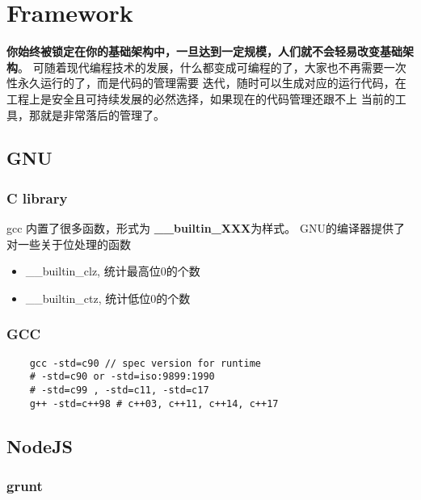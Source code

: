 \clearpage
\part{Framework}

\textbf{你始终被锁定在你的基础架构中，一旦达到一定规模，人们就不会轻易改变基础架构}。
可随着现代编程技术的发展，什么都变成可编程的了，大家也不再需要一次性永久运行的了，而是代码的管理需要
迭代，随时可以生成对应的运行代码，在工程上是安全且可持续发展的必然选择，如果现在的代码管理还跟不上
当前的工具，那就是非常落后的管理了。

\chapter{GNU}

\section{C library}
gcc 内置了很多函数，形式为 \textbf{ \_\_builtin\_XXX}为样式。
GNU的编译器提供了对一些关于位处理的函数
\begin{itemize}
    \item { \_\_builtin\_clz, 统计最高位0的个数 }
    \item { \_\_builtin\_ctz, 统计低位0的个数}
\end{itemize}

\section{GCC}

\begin{lstlisting}
    gcc -std=c90 // spec version for runtime
    # -std=c90 or -std=iso:9899:1990
    # -std=c99 , -std=c11, -std=c17
    g++ -std=c++98 # c++03, c++11, c++14, c++17
\end{lstlisting}

\chapter{NodeJS}

\section{grunt}

